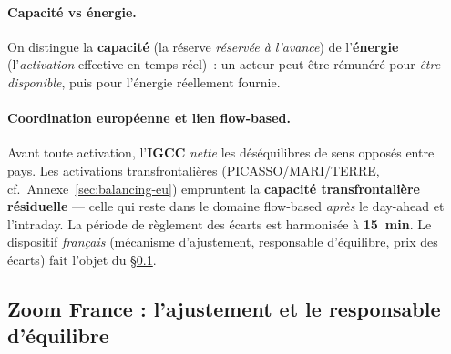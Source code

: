 \documentclass[11pt,a4paper]{article}
\begin{document}
\begin{center}
\end{center}

\paragraph{Capacité vs énergie.} On distingue la \textbf{capacité} (la réserve
\emph{réservée à l'avance}) de l'\textbf{énergie} (l'\emph{activation}
effective en temps réel)~: un acteur peut être rémunéré pour \emph{être
disponible}, puis pour l'énergie réellement fournie.

\paragraph{Coordination européenne et lien flow-based.} Avant toute activation,
l'\textbf{IGCC} \emph{nette} les déséquilibres de sens opposés entre pays. Les
activations transfrontalières (PICASSO/MARI/TERRE, cf.\ Annexe~\ref{sec:balancing-eu})
empruntent la \textbf{capacité transfrontalière résiduelle} — celle qui reste
dans le domaine flow-based \emph{après} le day-ahead et l'intraday. La période
de règlement des écarts est harmonisée à \textbf{15~min}. Le dispositif
\emph{français} (mécanisme d'ajustement, responsable d'équilibre, prix des
écarts) fait l'objet du \S\ref{sec:ajustement}.

\subsection{Zoom France : l'ajustement et le responsable d'équilibre}
\label{sec:ajustement}
\end{document}
